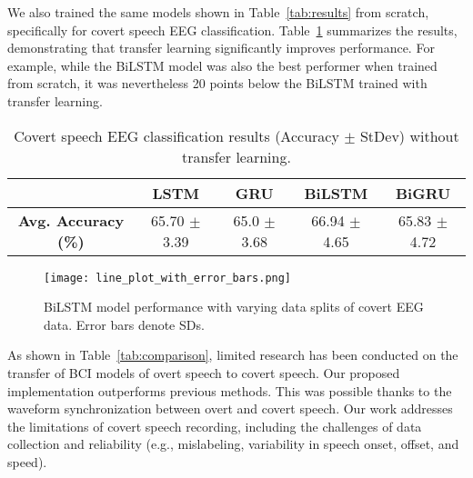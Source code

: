 \documentclass[onecolumn]{IEEEtran}
\begin{document}
We also trained the same models shown in Table~\ref{tab:results} from scratch,
specifically for covert speech EEG classification.
Table~\ref{tab:covert_results} summarizes the results, 
demonstrating that transfer learning significantly improves performance.
For example, while the BiLSTM model was also the best performer when trained from scratch,
it was nevertheless 20 points below the BiLSTM trained with transfer learning.

\begin{table}[!ht]
\centering
\caption{
    Covert speech EEG classification results (Accuracy $\pm$ StDev) without transfer learning.
}
\label{tab:covert_results}
\begin{tabular}{*5c}
\toprule
    & \textbf{LSTM} & \textbf{GRU} & \textbf{BiLSTM} & \textbf{BiGRU} \\ 
\midrule
\textbf{Avg. Accuracy (\%)} & 65.70 \(\pm\) 3.39 & 65.0 \(\pm\) 3.68 & 66.94 \(\pm\) 4.65 & 65.83 \(\pm\) 4.72 \\ 
\bottomrule
\end{tabular}%
\end{table}

\begin{figure}[!ht]
    \centering
    \texttt{[image: line\_plot\_with\_error\_bars.png]}  
    \caption{BiLSTM model performance with varying data splits of covert EEG data. Error bars denote SDs.}
    \label{fig:Covert}
\end{figure}

As shown in Table~\ref{tab:comparison}, 
limited research has been conducted on the transfer of BCI models of overt speech to covert speech.
Our proposed implementation outperforms previous methods.
This was possible thanks to the waveform synchronization between overt and covert speech. 
Our work addresses the limitations of covert speech recording, 
including the challenges of data collection and reliability (e.g., mislabeling, variability in speech onset, offset, and speed). 
\end{document}
